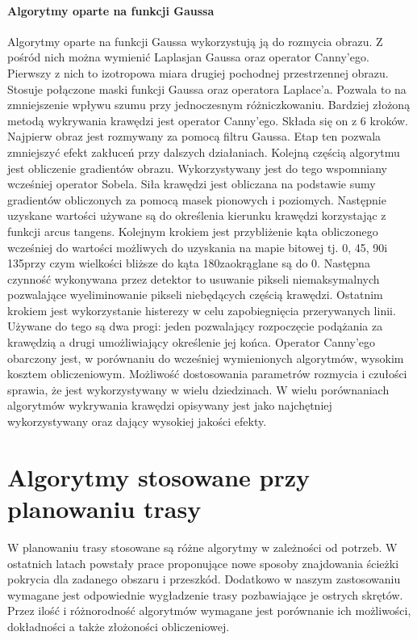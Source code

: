\paragraph{Algorytmy oparte na funkcji Gaussa}

Algorytmy oparte na funkcji Gaussa wykorzystują ją do rozmycia obrazu. Z pośród nich można wymienić Laplasjan Gaussa oraz operator Canny'ego. Pierwszy z nich to izotropowa miara drugiej pochodnej przestrzennej obrazu. Stosuje połączone maski funkcji Gaussa oraz operatora Laplace'a\cite{raman_et_al_study_and_comparison}. Pozwala to na zmniejszenie wpływu szumu przy jednoczesnym różniczkowaniu. Bardziej złożoną metodą wykrywania krawędzi jest operator Canny'ego. Składa się on z 6 kroków\cite{raman_et_al_study_and_comparison}. Najpierw obraz jest rozmywany za pomocą filtru Gaussa. Etap ten pozwala zmniejszyć efekt zakłuceń przy dalszych działaniach. Kolejną częścią algorytmu jest obliczenie gradientów obrazu. Wykorzystywany jest do tego wspomniany wcześniej operator Sobela. Siła krawędzi jest obliczana na podstawie sumy gradientów obliczonych za pomocą masek pionowych i poziomych. Następnie uzyskane wartości używane są do określenia kierunku krawędzi korzystając z funkcji arcus tangens. Kolejnym krokiem jest przybliżenie kąta obliczonego wcześniej do wartości możliwych do uzyskania na mapie bitowej tj. 0\textdegree, 45\textdegree, 90\textdegree i 135\textdegree przy czym wielkości bliższe do kąta 180\textdegree zaokrąglane są do 0\textdegree. Następna czynność wykonywana przez detektor to usuwanie pikseli niemaksymalnych pozwalające wyeliminowanie pikseli niebędących częścią krawędzi. Ostatnim krokiem jest wykorzystanie histerezy w celu zapobiegnięcia przerywanych linii. Używane do tego są dwa progi: jeden pozwalający rozpoczęcie podążania za krawędzią a drugi umożliwiający określenie jej końca. Operator Canny'ego obarczony jest, w porównaniu do wcześniej wymienionych algorytmów, wysokim kosztem obliczeniowym. Możliwość dostosowania parametrów rozmycia i czułości sprawia, że jest wykorzystywany w wielu dziedzinach. W wielu porównaniach algorytmów wykrywania krawędzi opisywany jest jako najchętniej wykorzystywany oraz dający wysokiej jakości efekty.\cite{raman_et_al_study_and_comparison}\cite{survey_on_edge_detection}

\section{Algorytmy stosowane przy planowaniu trasy}

W planowaniu trasy stosowane są różne algorytmy w zależności od potrzeb. W ostatnich latach powstały prace proponujące nowe sposoby znajdowania ścieżki pokrycia dla zadanego obszaru i przeszkód. Dodatkowo w naszym zastosowaniu wymagane jest odpowiednie wygładzenie trasy pozbawiające je ostrych skrętów. Przez ilość i różnorodność algorytmów wymagane jest porównanie ich możliwości, dokładności a także złożoności obliczeniowej.

